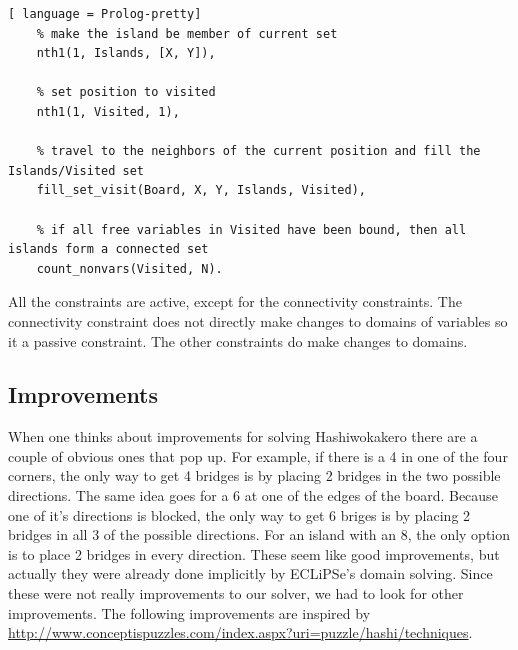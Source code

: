 \documentclass{report}
\begin{document}
\begin{itemize}
\begin{lstlisting}[ language = Prolog-pretty]
    % make the island be member of current set
    nth1(1, Islands, [X, Y]),

    % set position to visited
    nth1(1, Visited, 1),

    % travel to the neighbors of the current position and fill the Islands/Visited set
    fill_set_visit(Board, X, Y, Islands, Visited),

    % if all free variables in Visited have been bound, then all islands form a connected set
    count_nonvars(Visited, N).
\end{lstlisting}

\end{itemize}
All the constraints are active, except for the connectivity constraints. The connectivity constraint does not directly make changes to domains of variables so it a passive constraint. The other constraints do make changes to domains.
\subsection{Improvements}
When one thinks about improvements for solving Hashiwokakero there are a couple of obvious ones that pop up. For example, if there is a 4 in one of the four corners, the only way to get 4 bridges is by placing 2 bridges in the two possible directions. The same idea goes for a 6 at one of the edges of the board. Because one of it's directions is blocked, the only way to get 6 briges is by placing 2 bridges in all 3 of the possible directions. For an island with an 8, the only option is to place 2 bridges in every direction. These seem like good improvements, but actually they were already done implicitly by ECLiPSe's domain solving. Since these were not really improvements to our solver, we had to look for other improvements. The following improvements are inspired by \url{http://www.conceptispuzzles.com/index.aspx?uri=puzzle/hashi/techniques}.
\end{document}
